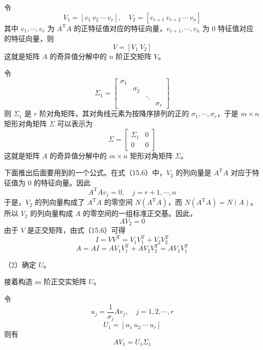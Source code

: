 \documentclass[UTF8, 12pt, fontset=fandol, oneside]{ctexart}
\begin{document}
令
\[
V_1=[v_1\ v_2\ \cdots\ v_r],\quad
V_2=[v_{r+1}\ v_{r+2}\ \cdots\ v_n]
\]
其中 $v_1,\cdots,v_r$ 为 $A^{\mathrm{T}}A$ 的正特征值对应的特征向量，$v_{r+1},\cdots,v_n$ 为 0 特征值对应的特征向量，则
\begin{equation}
V=[V_1\ V_2]
\tag{15.6}
\end{equation}
这就是矩阵 $A$ 的奇异值分解中的 $n$ 阶正交矩阵 $V$。

令
\[
\Sigma_1=
\begin{bmatrix}
\sigma_1&&\\
&\sigma_2&\\
&&\ddots\\
&&&\sigma_r
\end{bmatrix}
\]
则 $\Sigma_1$ 是 $r$ 阶对角矩阵，其对角线元素为按降序排列的正的 $\sigma_1,\cdots,\sigma_r$，于是 $m\times n$ 矩形对角矩阵 $\Sigma$ 可以表示为
\begin{equation}
\Sigma=
\begin{bmatrix}
\Sigma_1&0\\
0&0
\end{bmatrix}
\tag{15.7}
\end{equation}
这就是矩阵 $A$ 的奇异值分解中的 $m\times n$ 矩形对角矩阵 $\Sigma$。

下面推出后面要用到的一个公式。在式（15.6）中，$V_2$ 的列向量是 $A^{\mathrm{T}}A$ 对应于特征值为 0 的特征向量。因此
\begin{equation}
A^{\mathrm{T}}Av_j=0,\quad j=r+1,\cdots,n
\tag{15.8}
\end{equation}
于是，$V_2$ 的列向量构成了 $A^{\mathrm{T}}A$ 的零空间 $N(A^{\mathrm{T}}A)$，而 $N(A^{\mathrm{T}}A)=N(A)$。所以 $V_2$ 的列向量构成 $A$ 的零空间的一组标准正交基。因此，
\begin{equation}
AV_2=0
\tag{15.9}
\end{equation}
由于 $V$ 是正交矩阵，由式（15.6）可得
\begin{equation}
I=VV^{\mathrm{T}}=V_1V_1^{\mathrm{T}}+V_2V_2^{\mathrm{T}}
\tag{15.10}
\end{equation}
\begin{equation}
A=AI=AV_1V_1^{\mathrm{T}}+AV_2V_2^{\mathrm{T}}=AV_1V_1^{\mathrm{T}}
\tag{15.11}
\end{equation}

（2）确定 $U$。

接着构造 $m$ 阶正交实矩阵 $U$。

令
\begin{equation}
u_j=\frac{1}{\sigma_j}Av_j,\quad j=1,2,\cdots,r
\tag{15.12}
\end{equation}
\begin{equation}
U_1=[u_1\ u_2\ \cdots\ u_r]
\tag{15.13}
\end{equation}
则有
\begin{equation}
AV_1=U_1\Sigma_1
\tag{15.14}
\end{equation}
\end{document}
